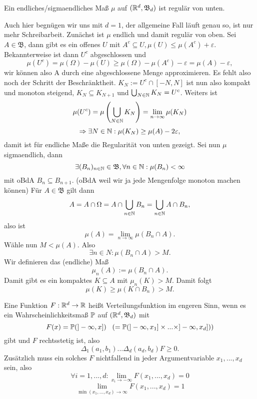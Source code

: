 			\begin{satz}
				Ein endliches/sigmaendliches Maß $\mu$ auf $(\R^d, \mathfrak{B}_d)$ ist regulär von unten.	
			\end{satz}
			
			\begin{bew}
				Auch hier begnügen wir uns mit $d=1$, der allgemeine Fall läuft genau so, ist nur mehr Schreibarbeit.\newline
				Zunächst ist $\mu$ endlich und damit regulär von oben. Sei $A\in\mathfrak{B}$, dann gibt es ein offenes $U$ mit $A^c\subseteq U, \mu(U)\le\mu(A^c)+\varepsilon$. Bekannterweise ist dann $U^c$ abgeschlossen und
				\[ \mu(U^c)=\mu(\Omega)-\mu(U)\ge \mu(\Omega)-\mu(A^c)-\varepsilon=\mu(A)-\varepsilon, \]
				wir können also A durch eine abgeschlossene Menge approximieren. Es fehlt also noch der Schritt der Beschränktheit. $K_N:=U^c\cap[-N,N]$ ist nun also kompakt und monoton steigend, $K_N\subseteq K_{N+1}$ und $\bigcup_{N\in\N}K_N=U^c$. Weiters ist
				\[ \mu(U^c)=\mu\left(\bigcup_{N\in\N} K_N\right)=\lim\limits_{n\to\infty}\mu(K_N) \]
				\[ \Rightarrow \exists N\in\N: \mu(K_N)\ge\mu(A)-2\varepsilon, \]
				damit ist für endliche Maße die Regularität von unten gezeigt. \newline
				Sei nun $\mu$ sigmaendlich, dann 
				\[ \exists (B_n)_{n\in\N}\in\mathfrak{B}, \forall n\in\N:\mu(B_n)<\infty \]
				mit oBdA $B_n\subseteq B_{n+1}$. (oBdA weil wir ja jede Mengenfolge monoton machen können)\newline
				Für $A\in\mathfrak{B}$ gilt dann
				\[ A=A\cap\Omega=A\cap\bigcup_{n\in\N} B_n=\bigcup_{n\in\N} A\cap B_n, \]
				also ist 
				\[ \mu(A)=\lim\limits_{n\to\infty}\mu(B_n\cap A). \]
				Wähle nun $M<\mu(A)$. Also 
				\[ \exists n\in N:\mu(B_n\cap A)> M. \]
				Wir definieren das (endliche) Maß
				\[ \mu_n(A):=\mu(B_n\cap A). \]
				Damit gibt es ein kompaktes $K\subseteq A$ mit $\mu_n(K)>M$. Damit folgt
				\[ \mu(K)\ge\mu(K\cap B_n)>M. \]
				\arge
			\end{bew}
			
			\begin{bem}
				Eine Funktion $F:\R^d\to\R$ heißt Verteilungsfunktion im engeren Sinn, wenn es ein Wahrscheinlichkeitsmaß $\P$ auf $(\R^d, \mathfrak{B}_d)$ mit 
				\[ F(x)=\P(]-\infty,x])\:\:\:\left(=\P(]-\infty,x_1]\times...\times]-\infty,x_d])\right) \]
				gibt und $F$ rechtsstetig ist, also
				\[ \Delta_1(a_1,b_1)...\Delta_d(a_d,b_d)F\ge0. \]
				Zusätzlich muss ein solches $F$ nichtfallend in jeder Argumentvariable $x_1,...,x_d$ sein, also
				\[ \forall i=1,...,d:\lim\limits_{x_i\to-\infty}F(x_1,...,x_d)=0 \]  
				\[ \lim\limits_{\min(x_1,...,x_d)\to\infty}F(x_1,...,x_d)=1 \]
			\end{bem}
			
